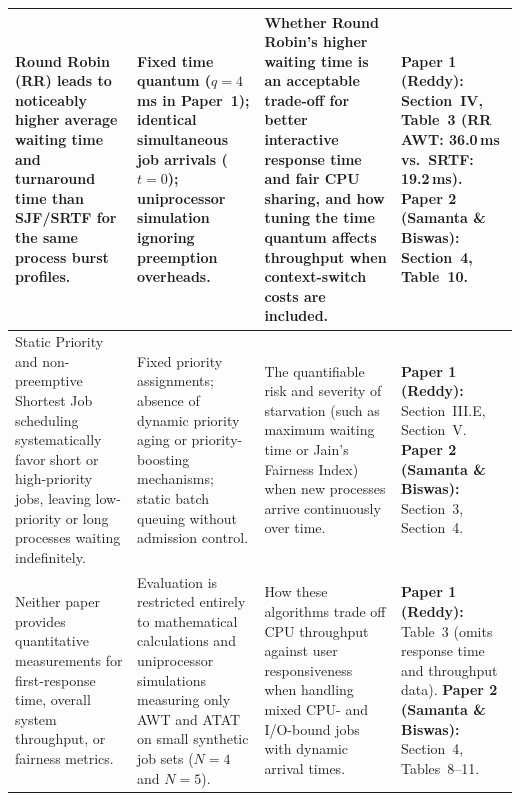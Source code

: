 \documentclass[11pt]{article}
\newcommand{\topicTitle}[1]{
    \vspace{1.2em}\noindent{\fontsize{14}{16.8}\selectfont \textbf{#1}}\par\vspace{0.5em}
}
\begin{document}
{\begin{longtable}{|>{\raggedright\arraybackslash}p{4.0cm}|>{\raggedright\arraybackslash}p{3.5cm}|>{\raggedright\arraybackslash}p{4.3cm}|>{\raggedright\arraybackslash}p{2.8cm}|}
    Round Robin (RR) leads to noticeably higher average waiting time and turnaround time than SJF/SRTF for the same process burst profiles. & 
    Fixed time quantum ($q = 4$\,ms in Paper~1); identical simultaneous job arrivals ($t=0$); uniprocessor simulation ignoring preemption overheads. & 
    Whether Round Robin's higher waiting time is an acceptable trade-off for better interactive response time and fair CPU sharing, and how tuning the time quantum affects throughput when context-switch costs are included. & 
    \textbf{Paper 1 (Reddy):} Section~IV, Table~3 (RR AWT: 36.0\,ms vs.\ SRTF: 19.2\,ms).\newline\newline
    \textbf{Paper 2 (Samanta \& Biswas):} Section~4, Table~10. \\
    \hline

    Static Priority and non-preemptive Shortest Job scheduling systematically favor short or high-priority jobs, leaving low-priority or long processes waiting indefinitely. & 
    Fixed priority assignments; absence of dynamic priority aging or priority-boosting mechanisms; static batch queuing without admission control. & 
    The quantifiable risk and severity of starvation (such as maximum waiting time or Jain's Fairness Index) when new processes arrive continuously over time. & 
    \textbf{Paper 1 (Reddy):} Section~III.E, Section~V.\newline\newline
    \textbf{Paper 2 (Samanta \& Biswas):} Section~3, Section~4. \\
    \hline

    Neither paper provides quantitative measurements for first-response time, overall system throughput, or fairness metrics. & 
    Evaluation is restricted entirely to mathematical calculations and uniprocessor simulations measuring only AWT and ATAT on small synthetic job sets ($N=4$ and $N=5$). & 
    How these algorithms trade off CPU throughput against user responsiveness when handling mixed CPU- and I/O-bound jobs with dynamic arrival times. & 
    \textbf{Paper 1 (Reddy):} Table~3 (omits response time and throughput data).\newline\newline
    \textbf{Paper 2 (Samanta \& Biswas):} Section~4, Tables~8--11. \\
    \hline

\end{longtable}
}

\vspace{0.8em}
\topicTitle{Synthesis Analysis Questions}
\end{document}
